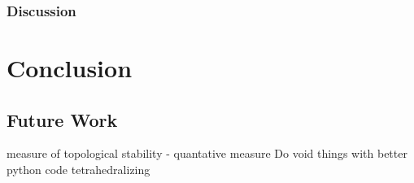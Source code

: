 \documentclass[ma]{uncgdissertationexp}
\theoremstyle{plain}
\theoremstyle{definition}
\theoremstyle{remark}
\begin{document}
\subsection{Discussion}

\chapter{Conclusion}
\section{Future Work}
measure of topological stability - quantative measure
Do void things with better python code tetrahedralizing



\backmatter
\end{document}
